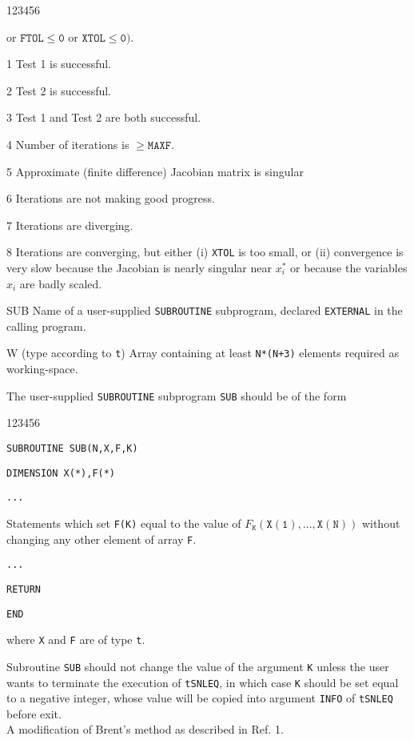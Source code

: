 \begin{DLtt}{123456}
\begin{DLtt}{12}
or $\mathtt{FTOL \le 0}$ or $\mathtt{XTOL \le 0})$.
\item[1] Test 1 is successful.
\item[2] Test 2 is successful.
\item[3] Test 1 and Test 2 are both successful.
\item[4] Number of iterations is $\ge \mathtt{MAXF}$.
\item[5] Approximate (finite difference) Jacobian matrix is singular
\item[6] Iterations are not making good progress.
\item[7] Iterations are diverging.
\item[8] Iterations are converging, but either (i) {\tt XTOL} is too
small, or (ii) convergence is very slow because the Jacobian is
nearly singular near $x_i^*$ or because the variables $x_i$ are badly
scaled.
\end{DLtt}
\item[SUB]Name of a user-supplied {\tt SUBROUTINE} subprogram,
declared {\tt EXTERNAL} in the calling program.
\item[W] (type according to {\tt t}) Array containing at least
{\tt N*(N+3)} elements required as working-space.
\end{DLtt}
\par
The user-supplied {\tt SUBROUTINE} subprogram {\tt SUB} should
be of the form
\begin{DLtt}{123456}
 \item[] {\tt SUBROUTINE SUB(N,X,F,K)}
 \item[] {\tt DIMENSION X(*),F(*)}
 \item[] {\tt ...}
 \item[] Statements which set {\tt F(K)} equal to the value of
$F_{\mathtt{K}}(\mathtt{X(1),...,X(N)})$ without changing any other
element of array {\tt F}.
\item[] {\tt ...}
\item[] {\tt RETURN}
\item[] {\tt END}
\end{DLtt}
where {\tt X} and {\tt F} are of type {\tt t}.
\par
Subroutine {\tt SUB} should not change the value of the argument
{\tt K} unless the user wants to terminate the execution of
{\tt tSNLEQ}, in which case {\tt K} should be set equal to a negative
integer, whose value will be copied into argument {\tt INFO} of
{\tt tSNLEQ} before exit. \\ [4mm]
\Method
A modification of Brent's method as described in Ref. 1.
